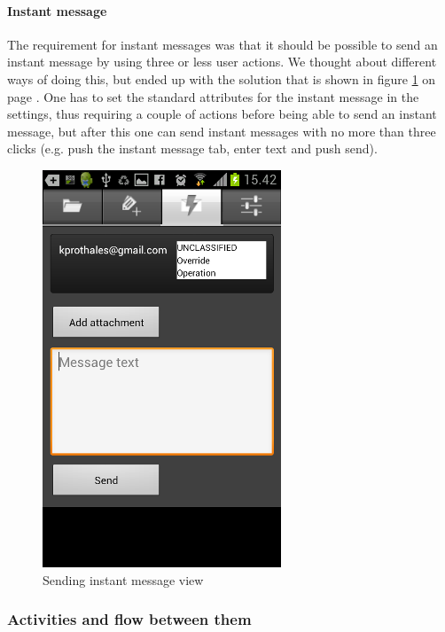 \newpage

\paragraph{Instant message}\hfill
\newline
The requirement for instant messages was that it should be possible to send an instant message by using three or less user actions. We thought about different ways of doing this, but ended up with the solution that is shown in figure \ref{fig:frontend_instamessage} on page \pageref{fig:frontend_instamessage}.
One has to set the standard attributes for the instant message in the settings, thus requiring a couple of actions before being able to send an instant message, but after this one can send instant messages with no more than three clicks (e.g. push the instant message tab, enter text and push send). 

\begin{figure}[H]
\begin{center}
\includegraphics{instantmessage_final}
\end{center}
\caption{Sending instant message view} \label{fig:frontend_instamessage}
\end{figure}

\newpage

\subsubsection{Activities and flow between them}

